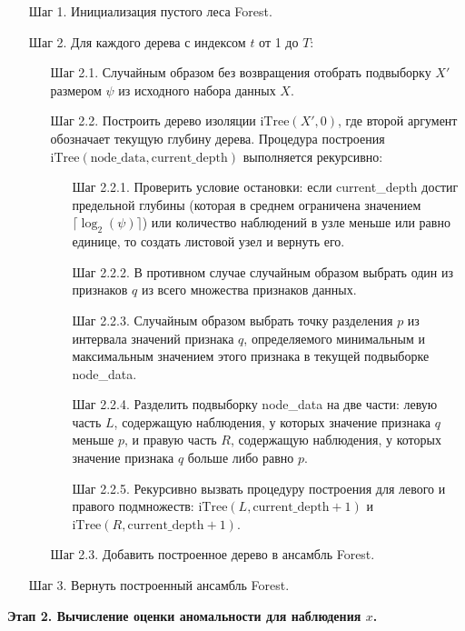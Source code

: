 \documentclass[14pt,a4paper]{extarticle}
\begin{document}
\begin{itemize}
\item[Шаг 1.] Инициализация пустого леса Forest.
\item[Шаг 2.] Для каждого дерева с индексом $t$ от 1 до $T$:
\begin{itemize}
    \item[Шаг 2.1.] Случайным образом без возвращения отобрать подвыборку $X'$ размером $\psi$ из исходного 
    набора данных $X$.
    \item[Шаг 2.2.] Построить дерево изоляции $\text{iTree}(X', 0)$, где второй аргумент обозначает текущую 
    глубину дерева. Процедура построения $\text{iTree}(\text{node\_data}, \text{current\_depth})$ выполняется 
    рекурсивно:
    \begin{itemize}
        \item[Шаг 2.2.1.] Проверить условие остановки: если current\_depth достиг предельной глубины 
        (которая в среднем ограничена значением $\lceil \log_{2}(\psi) \rceil$) или количество наблюдений 
        в узле меньше или равно единице, то создать листовой узел и вернуть его.
        \item[Шаг 2.2.2.] В противном случае случайным образом выбрать один из признаков $q$ из всего 
        множества признаков данных.
        \item[Шаг 2.2.3.] Случайным образом выбрать точку разделения $p$ из интервала значений признака 
        $q$, определяемого минимальным и максимальным значением этого признака в текущей подвыборке 
        node\_data.
        \item[Шаг 2.2.4.] Разделить подвыборку node\_data на две части: левую часть $L$, содержащую 
        наблюдения, у которых значение признака $q$ меньше $p$, и правую часть $R$, содержащую наблюдения, 
        у которых значение признака $q$ больше либо равно $p$.
        \item[Шаг 2.2.5.] Рекурсивно вызвать процедуру построения для левого и правого подмножеств: 
        $\text{iTree}(L, \text{current\_depth} + 1)$ и $\text{iTree}(R, \text{current\_depth} + 1)$.
    \end{itemize}
    \item[Шаг 2.3.] Добавить построенное дерево в ансамбль Forest.
\end{itemize}
\item[Шаг 3.] Вернуть построенный ансамбль Forest.
\end{itemize}

\textbf{Этап 2. Вычисление оценки аномальности для наблюдения $x$.}
\end{document}
